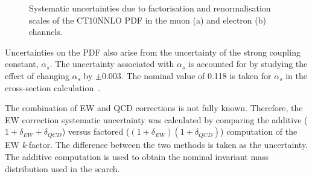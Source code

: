 \begin{figure}[h!]
\begin{subfigure}[h]{0.42\textwidth}
        \caption{}
        \label{fig:uncert:eescaleZ}
    \end{subfigure}
    \caption{Systematic uncertainties due to factorisation and renormalisation scales of the CT10NNLO PDF in the muon (a) and electron (b) channels.}
    \label{fig:uncert:scales}
\end{figure}

Uncertainties on the PDF also arise from the uncertainty of the strong coupling constant, $\alpha_s$. The uncertainty associated with  $\alpha_s$ is accounted for by studying the effect of changing $\alpha_s$ by $\pm 0.003$. The nominal value of 0.118 is taken for $\alpha_s$ in the cross-section calculation~\cite{Butterworth_2016}.

The combination of EW and QCD corrections is not fully known. Therefore, the EW correction systematic uncertainty was calculated by comparing the additive ($1 + \delta_{EW} + \delta_{QCD}$) versus factored ($(1 + \delta_{EW})(1 + \delta_{QCD})$) computation of the EW \emph{k}-factor. The difference between the two methods is taken as the uncertainty. The additive computation is used to obtain the nominal invariant mass distribution used in the search. 

